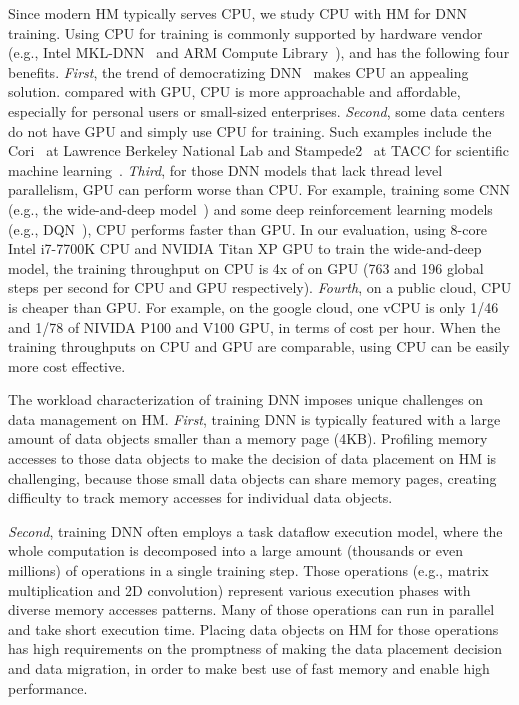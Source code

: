Since modern HM typically serves CPU, we study CPU with HM for DNN training. Using CPU for training is commonly supported by hardware vendor (e.g., Intel MKL-DNN~\cite{intelMKL} and ARM Compute Library~\cite{arm_cl}), and has the following four benefits. 
\textit{First}, the trend of democratizing DNN~\cite{democratization_ai} makes CPU an appealing solution. compared with GPU, CPU is more approachable and affordable, especially for personal users or small-sized enterprises. \textit{Second}, some data centers do not have GPU and simply use CPU for training. Such examples include the Cori~\cite{lbnl_cori} at Lawrence Berkeley National Lab and Stampede2~\cite{tacc_stampede} at TACC for scientific machine learning~\cite{ 8658402, Kurth:2018:EDL:3291656.3291724, Mathuriya:2018:CUD:3291656.3291743,  tacc_ml_CPU_training}. \textit{Third}, for those DNN models that lack thread level parallelism, GPU can perform worse than CPU. For example, training some CNN (e.g., the wide-and-deep model~\cite{DBLP:journals/corr/ChengKHSCAACCIA16}) and some deep reinforcement learning models (e.g., DQN~\cite{Hasselt:2016:DRL:3016100.3016191}), CPU performs faster than GPU. In our evaluation, using 8-core Intel i7-7700K CPU and NVIDIA Titan XP GPU to train the wide-and-deep model, the training throughput on CPU is 4x of on GPU (763 and 196 global steps per second for CPU and GPU respectively). \textit{Fourth}, on a public cloud, CPU is cheaper than GPU. For example, on the google cloud, one vCPU %
is only 1/46 and 1/78 of NIVIDA P100 and V100 GPU, in terms of cost per hour. When the training throughputs on CPU and GPU are comparable, using CPU can be easily more cost effective. 


The workload characterization of training DNN imposes unique challenges on data management on HM. \textit{First}, training DNN is typically featured with a large amount of data objects smaller than a memory page (4KB). Profiling memory accesses to those data objects to make the decision of data placement on HM is challenging, because those small data objects can share memory pages, creating difficulty to track memory accesses for individual data objects. 

\textit{Second}, training DNN often employs a task dataflow execution model, where the whole computation is decomposed into a large amount (thousands or even millions) of operations in a single training step. Those operations (e.g., matrix multiplication and 2D convolution) represent various execution phases with diverse memory accesses patterns. Many of those operations can run in parallel and take short execution time. Placing data objects on HM for those operations has high requirements on the promptness of making the data placement decision and data migration, in order to make best use of fast memory and enable high performance. 

